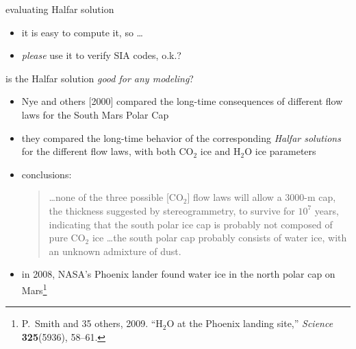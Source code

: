 \begin{frame}{evaluating Halfar solution}


\begin{itemize}
\item it is easy to compute it, so \dots
\item \emph{please} use it to verify SIA codes, o.k.?
\end{itemize}
\end{frame}


\begin{frame}{is the Halfar solution \emph{good for any modeling}?}

\begin{itemize}
\item Nye and others [2000]\nocite{NyeIcarus2000} compared the long-time consequences of different flow laws for the South Mars Polar Cap
\item they compared the long-time behavior of the corresponding \emph{Halfar solutions} for the different flow laws, with both $\text{CO}_2$ ice and $\text{H}_2\text{O}$ ice parameters
\item conclusions:
  \begin{quote}
  \dots none of the three possible [$\text{CO}_2$] flow laws will allow a 3000-m cap, the thickness suggested by stereogrammetry, to survive for $10^7$ years, indicating that the south polar ice cap is probably not composed of pure $\text{CO}_2$ ice \dots the south polar cap probably consists of water ice, with an unknown admixture of dust.
  \end{quote}
\item in 2008, NASA's Phoenix lander found water ice in the north polar cap on Mars\footnote{\tiny P.~Smith and 35 others, 2009.  ``$\text{H}_2\text{O}$ at the Phoenix landing site,'' \emph{Science} \textbf{325}(5936), 58--61.}
\end{itemize}
\end{frame}


